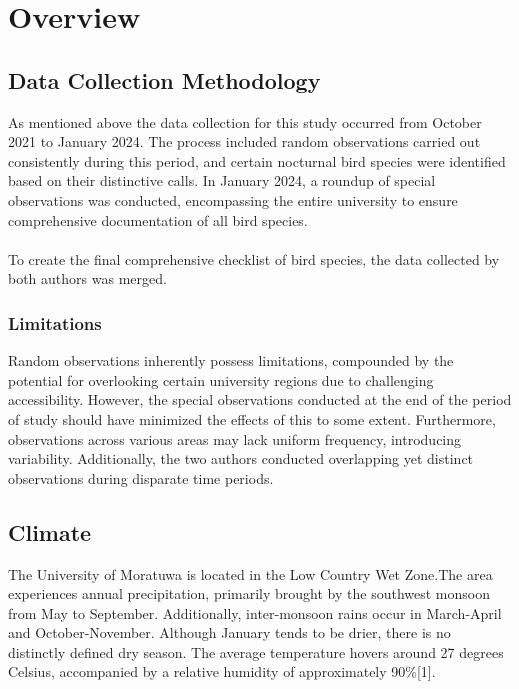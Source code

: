 \chapter{Overview}
\label{cp:overview}
\section{Data Collection Methodology}
As mentioned above the data collection for this study occurred from October 2021 to January 2024. The process included random observations carried out consistently during this period, and certain nocturnal bird species were identified based on their distinctive calls. In January 2024, a roundup of special observations was conducted, encompassing the entire university to ensure comprehensive documentation of all bird species.
\\\\
To create the final comprehensive checklist of bird species, the data collected by both authors was merged.

\begin{importantbox}
\subsection{Limitations}
 Random observations inherently possess limitations, compounded by the potential for overlooking certain university regions due to challenging accessibility. However, the special observations conducted at the end of the period of study should have minimized the effects of this to some extent. Furthermore, observations across various areas may lack uniform frequency, introducing variability. Additionally, the two authors conducted overlapping yet distinct observations during disparate time periods.
\end{importantbox}

\section{Climate}
The University of Moratuwa is located in the Low Country Wet Zone.The area experiences annual precipitation, primarily brought by the southwest monsoon from May to September. Additionally, inter-monsoon rains occur in March-April and October-November. Although January tends to be drier, there is no distinctly defined dry season. The average temperature hovers around 27 degrees Celsius, accompanied by a relative humidity of approximately 90\%[1].

